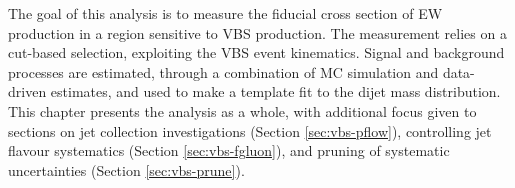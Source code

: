 The goal of this analysis is to measure the fiducial cross section of \ac{EW}
\Zyjj production in a region sensitive to \ac{VBS} \Zy production.
%
The measurement relies on a cut-based selection, exploiting the \ac{VBS} event
kinematics. Signal and background processes are estimated, through a combination
of \ac{MC} simulation and data-driven estimates, and used to make a template fit
to the dijet mass distribution. This chapter presents the analysis as a whole,
with additional focus given to sections on jet collection investigations
(Section \ref{sec:vbs-pflow}),
controlling jet flavour systematics (Section \ref{sec:vbs-fgluon}), and pruning
  of systematic uncertainties (Section \ref{sec:vbs-prune}).
